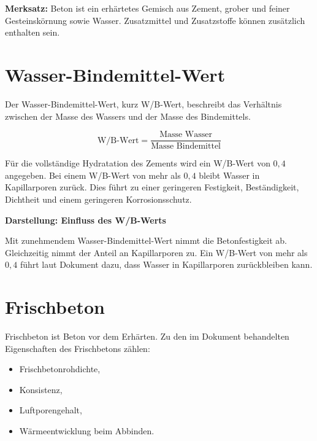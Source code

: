 \documentclass[
  12pt,
  a4paper,
  oneside
]{scrreprt}
\begin{document}
\begin{merksatzbox}
\textbf{Merksatz:}
Beton ist ein erhärtetes Gemisch aus Zement, grober und feiner
Gesteinskörnung sowie Wasser. Zusatzmittel und Zusatzstoffe können
zusätzlich enthalten sein.

\end{merksatzbox}

\section{Wasser-Bindemittel-Wert}

Der Wasser-Bindemittel-Wert, kurz W/B-Wert, beschreibt das Verhältnis
zwischen der Masse des Wassers und der Masse des Bindemittels.

\begin{equation}
  \text{W/B-Wert}
  =
  \frac{\text{Masse Wasser}}{\text{Masse Bindemittel}}
\end{equation}



Für die vollständige Hydratation des Zements wird ein W/B-Wert von
$0{,}4$ angegeben. Bei einem W/B-Wert von mehr als $0{,}4$ bleibt
Wasser in Kapillarporen zurück. Dies führt zu einer geringeren
Festigkeit, Beständigkeit, Dichtheit und einem geringeren
Korrosionsschutz.


\begin{darstellungsbox}
\textbf{Darstellung: Einfluss des W/B-Werts}

Mit zunehmendem Wasser-Bindemittel-Wert nimmt die Betonfestigkeit ab.
Gleichzeitig nimmt der Anteil an Kapillarporen zu. Ein W/B-Wert von
mehr als $0{,}4$ führt laut Dokument dazu, dass Wasser in
Kapillarporen zurückbleiben kann.
\end{darstellungsbox}

\section{Frischbeton}

Frischbeton ist Beton vor dem Erhärten. Zu den im Dokument behandelten
Eigenschaften des Frischbetons zählen:

\begin{itemize}
  \item Frischbetonrohdichte,
  \item Konsistenz,
  \item Luftporengehalt,
  \item Wärmeentwicklung beim Abbinden.
\end{itemize}
\end{document}
